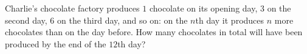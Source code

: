 Charlie's chocolate factory produces $1$ chocolate on its opening day, $3$ on the second day, $6$ on the third day, and so on: on the $n$th day it produces $n$ more chocolates than on the day before. How many chocolates in total will have been produced by the end of the $12$th day?
